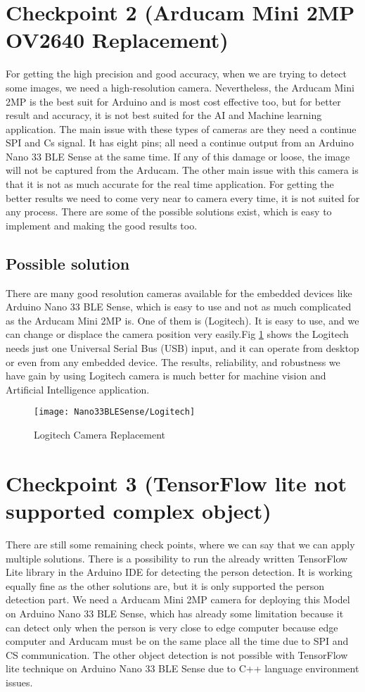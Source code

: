 \section{Checkpoint 2 (Arducam Mini 2MP OV2640 Replacement)}
For getting the high precision and good accuracy, when we are trying to detect some images, we need a high-resolution camera. Nevertheless, the Arducam Mini 2MP is the best suit for Arduino and is most cost effective too, but for better result and accuracy, it is not best suited for the AI and Machine learning application. The main issue with these types of cameras are they need a continue SPI and Cs signal. It has eight pins; all need a continue output from an Arduino Nano 33 BLE Sense at the same time. If any of this damage or loose, the image will not be captured from the Arducam. The other main issue with this camera is that it is not as much accurate for the real time application. For getting the better results we need to come very near to camera every time, it is not suited for any process. There are some of the possible solutions exist, which is easy to implement and making the good results too.
\subsection{Possible solution}
There are many good resolution cameras available for the embedded devices like Arduino Nano 33 BLE Sense, which is easy to use and not as much complicated as the Arducam Mini 2MP is. One of them is (Logitech). It is easy to use, and we can change or displace the camera position very easily.Fig \ref{Logitech Camera} shows the Logitech needs just one Universal Serial Bus (USB) input, and it can operate from desktop or even from any embedded device. The results, reliability, and robustness we have gain by using Logitech camera is much better for machine vision and Artificial Intelligence application. 
\begin{figure}[h]
	\centering
	\texttt{[image: Nano33BLESense/Logitech]}
	\caption{Logitech Camera Replacement}
	\label{Logitech Camera}
\end{figure}
\section{Checkpoint 3 (TensorFlow lite not supported complex object)}
There are still some remaining check points, where we can say that we can apply multiple solutions. There is a possibility to run the already written TensorFlow Lite library in the Arduino IDE for detecting the person detection. It is working equally fine as the other solutions are, but it is only supported the person detection part. We need a Arducam Mini 2MP camera for deploying this Model on Arduino Nano 33 BLE Sense, which has already some limitation because it can detect only when the person is very close to edge computer because edge computer and Arducam must be on the same place all the time due to SPI and CS communication. The other object detection is not possible with TensorFlow lite technique on Arduino Nano 33 BLE Sense due to C++ language environment issues.
